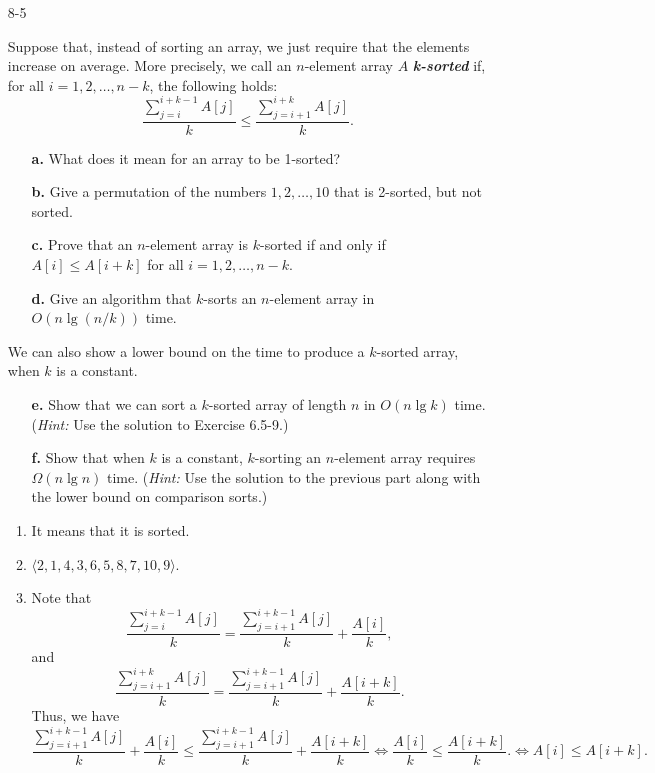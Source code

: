 \begin{enumerate}
\item[8-5]{Suppose that, instead of sorting an array, we just require that the
elements increase on average. More precisely, we call an $n$-element array $A$
\textbf{\emph{k-sorted}} if, for all $i = 1, 2, \dots, n - k$, the following
holds:
\[
  \frac{\sum_{j = i}^{i + k - 1} A[j]}{k} \le \frac{\sum_{j = i + 1}^{i + k} A[j]}{k}.
\]
\begin{enumerate}
\item[\textbf{a.}]{What does it mean for an array to be 1-sorted?}
\item[\textbf{b.}]{Give a permutation of the numbers $1, 2, \dots, 10$ that is
2-sorted, but not sorted.}
\item[\textbf{c.}]{Prove that an $n$-element array is $k$-sorted if and only if
$A[i] \le A[i + k]$ for all $i = 1, 2, \dots, n - k$.}
\item[\textbf{d.}]{Give an algorithm that $k$-sorts an $n$-element array in
$O(n \lg (n/k))$ time.}
\end{enumerate}
We can also show a lower bound on the time to produce a $k$-sorted array, when
$k$ is a constant.

\begin{enumerate}
\item[\textbf{e.}]{Show that we can sort a $k$-sorted array of length $n$ in
$O(n \lg k)$ time. (\emph{Hint:} Use the solution to Exercise 6.5-9.)}
\item[\textbf{f.}]{Show that when $k$ is a constant, $k$-sorting an $n$-element
array requires $\Omega(n \lg n)$ time. (\emph{Hint:} Use the solution to the
previous part along with the lower bound on comparison sorts.)}
\end{enumerate}
}

\begin{framed}
\begin{enumerate}
\item It means that it is sorted.
\item $\langle 2, 1, 4, 3, 6, 5, 8, 7, 10, 9 \rangle$.
\item Note that
\[
  \frac{\sum_{j = i}^{i + k - 1} A[j]}{k} = \frac{\sum_{j = i + 1}^{i + k - 1} A[j]}{k} + \frac{A[i]}{k},
\]
and
\[
  \frac{\sum_{j = i + 1}^{i + k} A[j]}{k} = \frac{\sum_{j = i + 1}^{i + k - 1} A[j]}{k} + \frac{A[i + k]}{k}.
\]
Thus, we have
\[
  \frac{\sum_{j = i + 1}^{i + k - 1} A[j]}{k} + \frac{A[i]}{k} \le \frac{\sum_{j = i + 1}^{i + k - 1} A[j]}{k} + \frac{A[i + k]}{k}
  \iff \frac{A[i]}{k} \le \frac{A[i + k]}{k}.
  \iff A[i] \le A[i + k].
\]


\end{enumerate}
\end{framed}
\end{enumerate}

